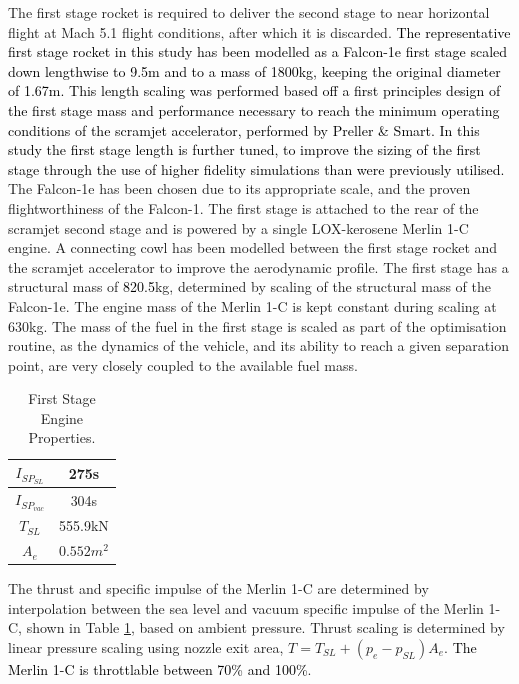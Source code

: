 The first stage rocket is required to deliver the second stage to near horizontal flight at Mach 5.1 flight conditions,
after which it is discarded. 
\textcolor{black}{The representative first stage rocket in this study has been  modelled as a Falcon-1e first stage scaled down
lengthwise to 9.5m and to a mass of 1800kg, keeping the original diameter of 1.67m\cite{Vehicle2008}. This length scaling was performed based off a first principles design of the first stage mass and performance necessary to reach the minimum operating conditions of the scramjet accelerator, performed by Preller \& Smart\cite{Preller2017b}. In this study the first stage length is further tuned, to improve the sizing of the first stage through the use of higher fidelity simulations than were previously utilised.}
The Falcon-1e has been chosen due to its appropriate scale, and the proven flightworthiness of the Falcon-1. 
 The first stage is attached to the rear of the scramjet
second stage and is powered by a single LOX-kerosene Merlin 1-C engine. A connecting cowl has been modelled between the first stage rocket and the scramjet accelerator to improve the aerodynamic profile.  The first stage has a structural mass of
\textcolor{black}{820.5}kg, determined by scaling of the structural mass of the Falcon-1e. The engine mass of the Merlin 1-C is kept constant during scaling at 630kg\cite{Wade2017}. The mass of the
fuel in the first stage is scaled as part of the optimisation routine, as the dynamics of the vehicle, and its ability to reach a
given separation point, are very closely coupled to the available fuel mass.

\begin{table}[!h]
	\centering
	\begin{tabular}{|c|c|}
		\hline  $I_{SP_{SL}}$ & 275s \\ 
		\hline  $I_{SP_{vac}}$ & 304s\\ 
		\hline  $T_{SL}$ & 555.9kN \\ 
		\hline  $A_{e}$ & $0.552m^2$ \\ 
		\hline 
	\end{tabular} 
	\caption{First Stage Engine Properties\cite{Wade2017}.}
	\label{tab:1stStageEngine}
\end{table}
The thrust and specific impulse of the Merlin 1-C are determined by interpolation between the sea level and vacuum specific impulse of the Merlin 1-C, shown in Table \ref{tab:1stStageEngine}, based on ambient pressure. Thrust scaling is determined by linear pressure scaling using nozzle exit area, $T = T_{SL} + (p_e - p_{SL})A_e$. 
 \textcolor{black}{The Merlin 1-C is throttlable between 70\% and 100\%\cite{Norris2011}}.




